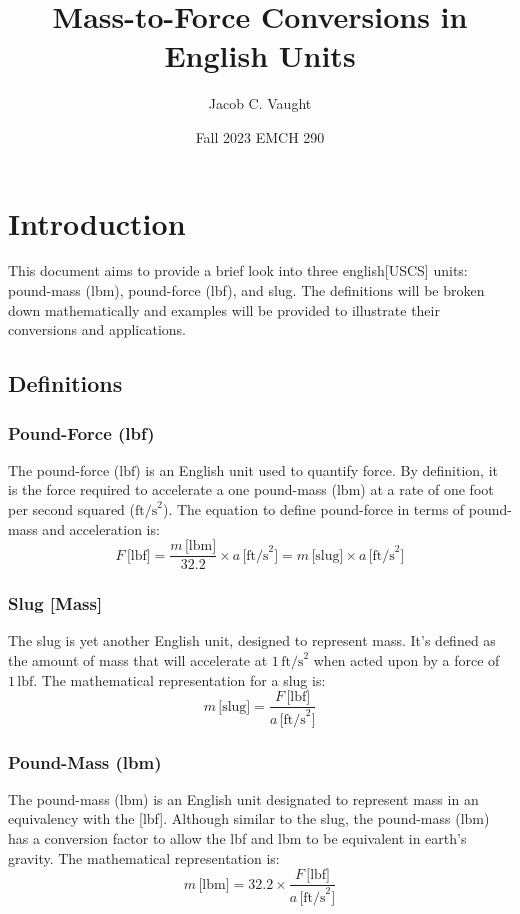 \documentclass[12pt]{article}
\title{Mass-to-Force Conversions in English Units}
\author{Jacob C. Vaught}
\date{Fall 2023 EMCH 290}
\begin{document}
\maketitle

\section*{Introduction}
This document aims to provide a brief look into three english[USCS] units: pound-mass (lbm), pound-force (lbf), and slug. The definitions will be broken down mathematically and examples will be provided to illustrate their conversions and applications.

\subsection*{Definitions}

\subsubsection*{Pound-Force (lbf)}
The pound-force (\( \text{lbf} \)) is an English unit used to quantify force. By definition, it is the force required to accelerate a one pound-mass (\( \text{lbm} \)) at a rate of one foot per second squared (\( \text{ft/s}^2 \)). The equation to define pound-force in terms of pound-mass and acceleration is:
\[
F \, \text{[lbf]} = \frac{m \, \text{[lbm]}}{32.2} \times a \, \text{[ft/s}^2] = m \, \text{[slug]} \times a \, \text{[ft/s}^2]
\]

\subsubsection*{Slug [Mass]}
The slug is yet another English unit, designed to represent mass. It's defined as the amount of mass that will accelerate at \( 1 \, \text{ft/s}^2 \) when acted upon by a force of \( 1 \, \text{lbf} \). The mathematical representation for a slug is:
\[
m \, \text{[slug]} = \frac{F \, \text{[lbf]}}{a \, \text{[ft/s}^2]}
\]

\subsubsection*{Pound-Mass (lbm)}
The pound-mass (\( \text{lbm} \)) is an English unit designated to represent mass in an equivalency with the [lbf]. Although similar to the slug, the pound-mass (\( \text{lbm} \)) has a conversion factor to allow the lbf and lbm to be equivalent in earth's gravity. The mathematical representation is:
\[
m \, \text{[lbm]} = 32.2 \times \frac{F \, \text{[lbf]}}{ a \, \text{[ft/s}^2]}
\]
\end{document}
